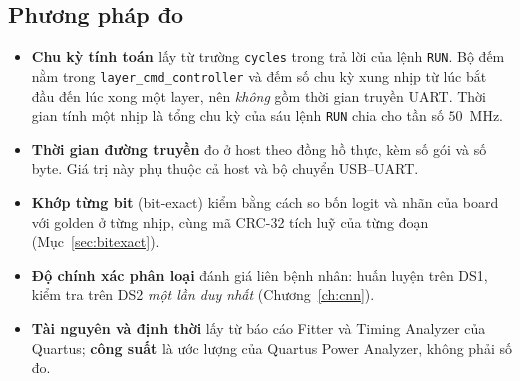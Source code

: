 \subsection{Phương pháp đo}
\begin{itemize}
  \item \textbf{Chu kỳ tính toán} lấy từ trường \texttt{cycles} trong trả lời của lệnh \texttt{RUN}.
  Bộ đếm nằm trong \texttt{layer\_cmd\_controller} và đếm số chu kỳ xung nhịp từ lúc bắt đầu đến lúc xong một layer, nên \emph{không} gồm thời gian truyền UART.
  Thời gian tính một nhịp là tổng chu kỳ của sáu lệnh \texttt{RUN} chia cho tần số $50$~MHz.
  \item \textbf{Thời gian đường truyền} đo ở host theo đồng hồ thực, kèm số gói và số byte.
  Giá trị này phụ thuộc cả host và bộ chuyển USB--UART.
  \item \textbf{Khớp từng bit} (bit-exact) kiểm bằng cách so bốn logit và nhãn của board với golden ở từng nhịp, cùng mã CRC-32 tích luỹ của từng đoạn (Mục~\ref{sec:bitexact}).
  \item \textbf{Độ chính xác phân loại} đánh giá liên bệnh nhân: huấn luyện trên DS1, kiểm tra trên DS2 \emph{một lần duy nhất} (Chương~\ref{ch:cnn}).
  \item \textbf{Tài nguyên và định thời} lấy từ báo cáo Fitter và Timing Analyzer của Quartus; \textbf{công suất} là ước lượng của Quartus Power Analyzer, không phải số đo.
\end{itemize}
